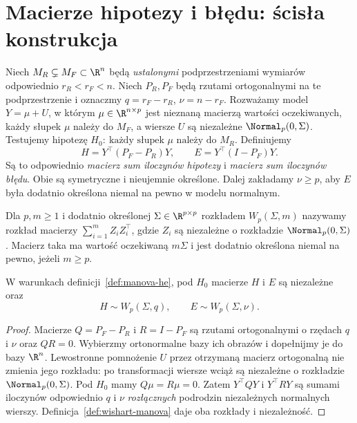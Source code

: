 \section{Macierze hipotezy i błędu: ścisła konstrukcja}
\begin{definicja}\label{def:manova-he}
Niech $M_R\subsetneq M_F\subset\R^n$ będą \emph{ustalonymi} podprzestrzeniami wymiarów odpowiednio $r_R<r_F<n$. Niech $P_R,P_F$ będą rzutami ortogonalnymi na te podprzestrzenie i oznaczmy $q=r_F-r_R$, $\nu=n-r_F$. Rozważamy model $Y=\mu+U$, w którym $\mu\in\R^{n\times p}$ jest nieznaną macierzą wartości oczekiwanych, każdy słupek $\mu$ należy do $M_F$, a wiersze $U$ są niezależne $\Normal_p(0,\Sigma)$. Testujemy hipotezę $H_0:\ \text{każdy słupek }\mu\text{ należy do }M_R$. Definiujemy
\[
 H=Y^\top(P_F-P_R)Y,\qquad E=Y^\top(I-P_F)Y.
\]
Są to odpowiednio \emph{macierz sum iloczynów hipotezy} i \emph{macierz sum iloczynów błędu}. Obie są symetryczne i nieujemnie określone. Dalej zakładamy $\nu\ge p$, aby $E$ była dodatnio określona niemal na pewno w modelu normalnym.
\end{definicja}

\begin{definicja}\label{def:wishart-manova}
Dla $p,m\ge1$ i dodatnio określonej $\Sigma\in\R^{p\times p}$ rozkładem $W_p(\Sigma,m)$ nazywamy rozkład macierzy $\sum_{i=1}^m Z_iZ_i^\top$, gdzie $Z_i$ są niezależne o rozkładzie $\Normal_p(0,\Sigma)$. Macierz taka ma wartość oczekiwaną $m\Sigma$ i jest dodatnio określona niemal na pewno, jeżeli $m\ge p$.
\end{definicja}

\begin{twierdzenie}\label{thm:wishart-he}
W warunkach definicji~\ref{def:manova-he}, pod $H_0$ macierze $H$ i $E$ są niezależne oraz
\[
 H\sim W_p(\Sigma,q),\qquad E\sim W_p(\Sigma,\nu).
\]
\end{twierdzenie}
\begin{proof}
Macierze $Q=P_F-P_R$ i $R=I-P_F$ są rzutami ortogonalnymi o rzędach $q$ i $\nu$ oraz $QR=0$. Wybierzmy ortonormalne bazy ich obrazów i dopełnijmy je do bazy $\R^n$. Lewostronne pomnożenie $U$ przez otrzymaną macierz ortogonalną nie zmienia jego rozkładu: po transformacji wiersze wciąż są niezależne o rozkładzie $\Normal_p(0,\Sigma)$. Pod $H_0$ mamy $Q\mu=R\mu=0$. Zatem $Y^\top QY$ i $Y^\top RY$ są sumami iloczynów odpowiednio $q$ i $\nu$ \emph{rozłącznych} podrodzin niezależnych normalnych wierszy. Definicja~\ref{def:wishart-manova} daje oba rozkłady i niezależność.
\end{proof}

